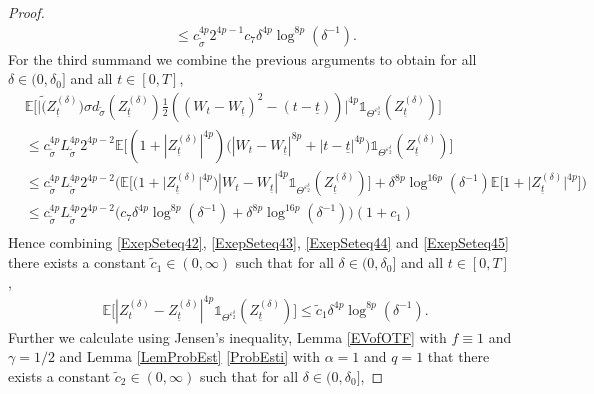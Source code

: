 \documentclass[11pt,a4paper]{article}
\numberwithin{equation}{section}
\theoremstyle{definition}
\newcommand{\E}{{\mathbb{E}}}
\begin{document}
\begin{proof}
\begin{equation}
\begin{aligned}
            &\leq c_{\widetilde \sigma}^{4p} 2^{4p-1} c_7  \delta^{4p} \log^{8p}(\delta^{-1}).
        \end{aligned} 
    \end{equation}  
    For the third summand we combine the previous arguments to obtain for all $\delta\in(0,\delta_0]$ and all $t\in[0,T]$,
    \begin{equation}\label{ExepSeteq45}
        \begin{aligned}
            &\E\Big[ \big|\widetilde (Z^{(\delta)}_{\underline t}) \sigma d_{\widetilde \sigma} (Z^{(\delta)}_{\underline t}) \frac{1}{2}((W_t-W_{\underline t})^2 -(t-\underline t))\big|^{4p} \mathds{1}_{\Theta^{\varepsilon_2^\delta}}(Z_{\underline t}^{(\delta)}) \Big]\\
            &\leq c_{\widetilde \sigma}^{4p} L_{\widetilde\sigma}^{4p}2^{4p-2} \E\Big[ (1+ |Z^{(\delta)}_{\underline t}|^{4p}) \big(|W_t-W_{\underline t}|^{8p} +|t-\underline t|^{4p}\big)  \mathds{1}_{\Theta^{\varepsilon_2^\delta}}(Z_{\underline t}^{(\delta)}) \Big]\\
            &\leq c_{\widetilde \sigma}^{4p} L_{\widetilde\sigma}^{4p}2^{4p-2} \Big(\E\Big[ \big(1+ \big|Z^{(\delta)}_{\underline{t}}\big|^{4p}\big)   |W_t-W_{\underline{t}}|^{4p} \mathds{1}_{\Theta^{\varepsilon_2^\delta}}(Z_{\underline t}^{(\delta)})\Big] + \delta^{8p}\log^{16p}(\delta^{-1}) \E\big[ 1+ \big|Z^{(\delta)}_{\underline{t}}\big|^{4p}\big] \Big)\\
            &\leq c_{\widetilde \sigma}^{4p} L_{\widetilde\sigma}^{4p}2^{4p-2} \Big( c_7  \delta^{4p} \log^{8p}(\delta^{-1}) + \delta^{8p}\log^{16p}(\delta^{-1}) \Big)(1+ c_1)\\
        \end{aligned} 
    \end{equation}  
    Hence combining \eqref{ExepSeteq42}, \eqref{ExepSeteq43}, \eqref{ExepSeteq44} and \eqref{ExepSeteq45} there exists a constant $\widetilde c_1\in (0,\infty)$ such that for all $\delta\in(0,\delta_0]$ and all $t\in[0,T]$,
    \begin{equation}\label{ExepSeteq46}
        \begin{aligned}
            &\E\Big[  |Z_{t}^{(\delta)} - Z_{\underline t}^{(\delta)}|^{4p} \mathds{1}_{\Theta^{\varepsilon_2^\delta}}(Z_{\underline t}^{(\delta)})\Big]
            \leq \widetilde c_1 \delta^{4p} \log^{8p}(\delta^{-1}).
        \end{aligned} 
    \end{equation}  
    Further we calculate using Jensen's inequality, Lemma \ref{EVofOTF} with $f\equiv 1$ and $\gamma = 1/2$ and Lemma \ref{LemProbEst} \ref{ProbEsti} with $\alpha =1$ and $q =1$ that there exists a constant $\widetilde c_2\in(0,\infty)$ such that for all $\delta\in(0,\delta_0]$,

\end{proof}
\end{document}
